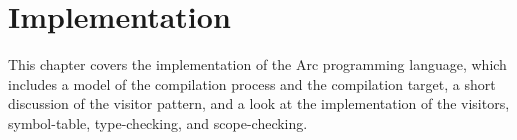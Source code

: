 \chapter{Implementation}\label{cha:implementation}
This chapter covers the implementation of the Arc programming language, which includes a model of the compilation process and the compilation target, a short discussion of the visitor pattern, and a look at the implementation of the visitors, symbol-table, type-checking, and scope-checking.















